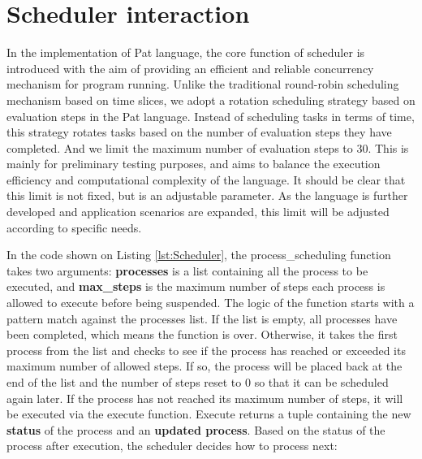 \documentclass{l4proj}
\begin{document}
\section{Scheduler interaction}

In the implementation of Pat language, the core function of scheduler is introduced with the aim of providing an efficient and reliable concurrency mechanism for program running. Unlike the traditional round-robin scheduling mechanism based on time slices, we adopt a rotation scheduling strategy based on evaluation steps in the Pat language. Instead of scheduling tasks in terms of time, this strategy rotates tasks based on the number of evaluation steps they have completed. And we limit the maximum number of evaluation steps to 30. This is mainly for preliminary testing purposes, and aims to balance the execution efficiency and computational complexity of the language. It should be clear that this limit is not fixed, but is an adjustable parameter. As the language is further developed and application scenarios are expanded, this limit will be adjusted according to specific needs.

In the code shown on Listing \ref{lst:Scheduler}, the process\_scheduling function takes two arguments: \textbf{processes} is a list containing all the process to be executed, and \textbf{max\_steps} is the maximum number of steps each process is allowed to execute before being suspended. The logic of the function starts with a pattern match against the processes list. If the list is empty, all processes have been completed, which means the function is over. Otherwise, it takes the first process from the list and checks to see if the process has reached or exceeded its maximum number of allowed steps. If so, the process will be placed back at the end of the list and the number of steps reset to 0 so that it can be scheduled again later. If the process has not reached its maximum number of steps, it will be executed via the execute function. Execute returns a tuple containing the new \textbf{status} of the process and an \textbf{updated process}. Based on the status of the process after execution, the scheduler decides how to process next:
\end{document}
